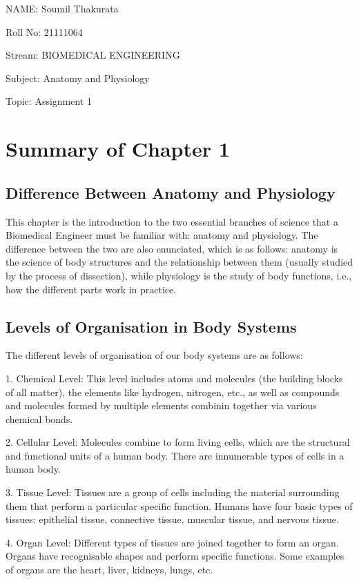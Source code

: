 \documentclass[11pt]{article}
\begin{document}
NAME: Soumil Thakurata

Roll No: 21111064

Stream: BIOMEDICAL ENGINEERING

Subject: Anatomy and Physiology

Topic: Assignment 1


\pagebreak

\section*{Summary of Chapter 1}

\subsection*{\centering Difference Between Anatomy and Physiology}

This chapter is the introduction to the two essential branches of science that a Biomedical Engineer must be familiar with: anatomy and physiology. The difference between the two are also enunciated, which is as follows: anatomy is the science of body structures and the relationship between them (usually studied by the process of dissection), while physiology is the study of body functions, i.e., how the different parts work in practice.

\subsection*{\centering Levels of Organisation in Body Systems}

The different levels of organisation of our body systems are as follows:

1. Chemical Level: This level includes atoms and molecules (the building blocks of all matter), the elements like hydrogen, nitrogen, etc., as well as compounds and molecules formed by multiple elements combinin together via various chemical bonds.

2. Cellular Level: Molecules combine to form living cells, which are the structural and functional units of a human body. There are innumerable types of cells in a human body.

3. Tissue Level: Tissues are a group of cells including the material surrounding them that perform a particular specific function. Humans have four basic types of tissues: epithelial tissue, connective tissue, muscular tissue, and nervous tissue.

4. Organ Level: Different types of tissues are joined together to form an organ. Organs have recognisable shapes and perform specific functions. Some examples of organs are the heart, liver, kidneys, lungs, etc.
\end{document}
